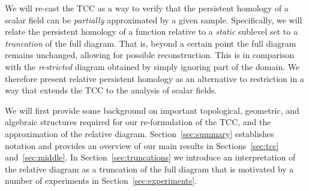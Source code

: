 We will re-cast the TCC as a way to verify that the persistent homology of a scalar field can be \emph{partially} approximated by a given sample. %
Specifically, we will relate the persistent homology of a function relative to a \emph{static} sublevel set to a \emph{truncation} of the full diagram.
That is, beyond a certain point the full diagram remains unchanged, allowing for possible reconstruction.
This is in comparison with the \emph{restricted} diagram obtained by simply ignoring part of the domain. %
We therefore present relative persistent homology as an alternative to restriction in a way that extends the TCC to the analysis of scalar fields.

We will first provide some background on important topological, geometric, and algebraic structures required for our re-formulation of the TCC, and the approximation of the relative diagram.
Section~\ref{sec:summary} establishes notation and provides an overview of our main results in Sections~\ref{sec:tcc} and~\ref{sec:middle}.%
In Section~\ref{sec:truncations} we introduce an interpretation of the relative diagram as a truncation of the full diagram that is motivated by a number of experiments in Section~\ref{sec:experiments}.%

